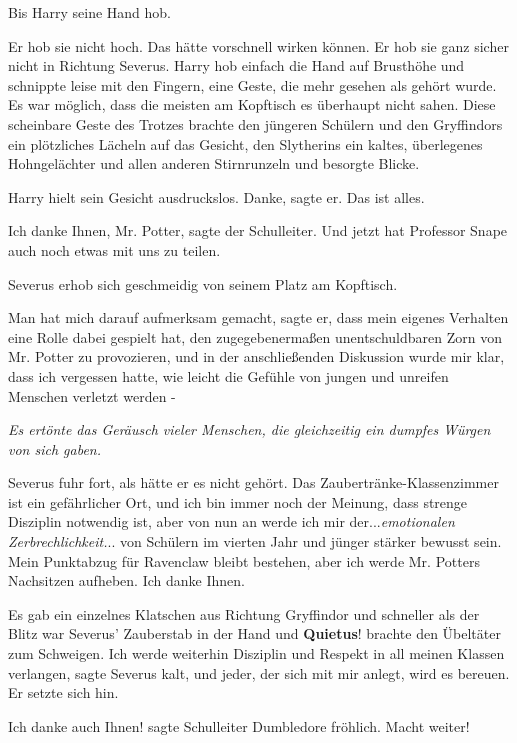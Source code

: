 Bis Harry seine Hand hob.

Er hob sie nicht hoch. Das hätte vorschnell wirken können. Er hob sie ganz
sicher nicht in Richtung Severus. Harry hob einfach die Hand auf Brusthöhe und
schnippte leise mit den Fingern, eine Geste, die mehr gesehen als gehört wurde.
Es war möglich, dass die meisten am Kopftisch es überhaupt nicht sahen. Diese
scheinbare Geste des Trotzes brachte den jüngeren Schülern und den Gryffindors
ein plötzliches Lächeln auf das Gesicht, den Slytherins ein kaltes, überlegenes
Hohngelächter und allen anderen Stirnrunzeln und besorgte Blicke.

Harry hielt sein Gesicht ausdruckslos. \glqq{}Danke\grqq{}, sagte er. \glqq{}Das
ist alles.\grqq{}

\glqq{}Ich danke Ihnen, Mr. Potter\grqq{}, sagte der Schulleiter. \glqq{}Und jetzt
hat Professor Snape auch noch etwas mit uns zu teilen.\grqq{}

Severus erhob sich geschmeidig von seinem Platz am Kopftisch.

\glqq{}Man hat mich darauf aufmerksam gemacht\grqq{}, sagte er, \glqq{}dass mein
eigenes Verhalten eine Rolle dabei gespielt hat, den zugegebenermaßen
unentschuldbaren Zorn von Mr. Potter zu provozieren, und in der anschließenden
Diskussion wurde mir klar, dass ich vergessen hatte, wie leicht die Gefühle von
jungen und unreifen Menschen verletzt werden -\grqq{}

\emph{Es ertönte das Geräusch vieler Menschen, die gleichzeitig ein dumpfes
Würgen von sich gaben.}

Severus fuhr fort, als hätte er es nicht gehört. \glqq{}Das
Zaubertränke-Klassenzimmer ist ein gefährlicher Ort, und ich bin immer noch der
Meinung, dass strenge Disziplin notwendig ist, aber von nun an werde ich mir
der...\emph{emotionalen Zerbrechlichkeit.}.. von Schülern im vierten Jahr und
jünger stärker bewusst sein. Mein Punktabzug für Ravenclaw bleibt bestehen, aber
ich werde Mr. Potters Nachsitzen aufheben. Ich danke Ihnen.\grqq{}

Es gab ein einzelnes Klatschen aus Richtung Gryffindor und schneller als der
Blitz war Severus' Zauberstab in der Hand und \glqq{}\textbf{Quietus}!\grqq{}
brachte den Übeltäter zum Schweigen. \glqq{}Ich werde weiterhin Disziplin und
Respekt in all meinen Klassen verlangen\grqq{}, sagte Severus kalt, \glqq{}und
jeder, der sich mit mir anlegt, wird es bereuen.\grqq{} Er setzte sich hin.

\glqq{}Ich danke auch Ihnen!\grqq{} sagte Schulleiter Dumbledore fröhlich. \glqq{}
Macht weiter!\grqq{}

